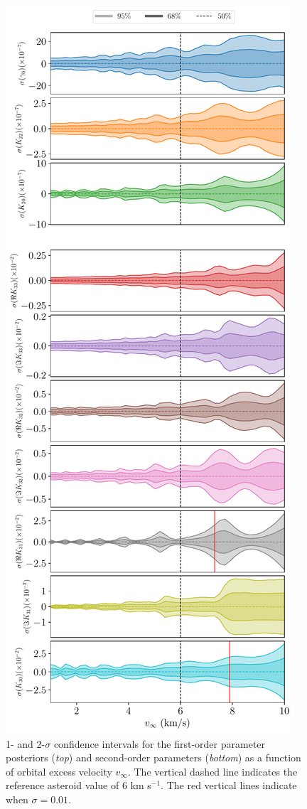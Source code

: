 \documentclass[fleqn,usenatbib]{mnras}
\begin{document}
\begin{figure}
  \centering
  \includegraphics[height=0.89\textheight]{figs/scan-vex.pdf}
  \caption{1- and 2-$\sigma$ confidence intervals for the first-order parameter posteriors (\textit{top}) and second-order parameters (\textit{bottom}) as a function of orbital excess velocity $v_\infty$. The vertical dashed line indicates the reference asteroid value of 6 km s$^{-1}$. The red vertical lines indicate when $\sigma = 0.01$.}
  \label{fig:scan-vex}
\end{figure}
\end{document}
